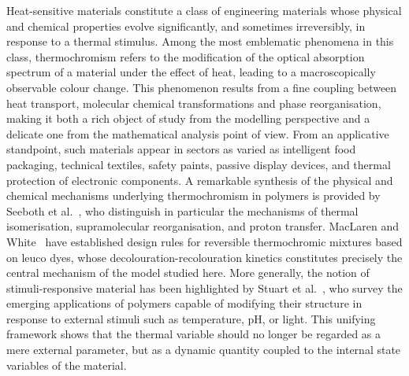 \documentclass[final,1p,times]{elsarticle}
\numberwithin{equation}{section}
\begin{document}
	Heat-sensitive materials constitute a class of engineering materials whose physical and chemical properties evolve significantly, and sometimes irreversibly, in response to a thermal stimulus. Among the most emblematic phenomena in this class, thermochromism refers to the modification of the optical absorption spectrum of a material under the effect of heat, leading to a macroscopically observable colour change. This phenomenon results from a fine coupling between heat transport, molecular chemical transformations and phase reorganisation, making it both a rich object of study from the modelling perspective and a delicate one from the mathematical analysis point of view. From an applicative standpoint, such materials appear in sectors as varied as intelligent food packaging, technical textiles, safety paints, passive display devices, and thermal protection of electronic components. A remarkable synthesis of the physical and chemical mechanisms underlying thermochromism in polymers is provided by Seeboth et al.~\cite{SeebothEtal2014}, who distinguish in particular the mechanisms of thermal isomerisation, supramolecular reorganisation, and proton transfer. MacLaren and White~\cite{MacLarenWhite2005} have established design rules for reversible thermochromic mixtures based on leuco dyes, whose decolouration-recolouration kinetics constitutes precisely the central mechanism of the model studied here. More generally, the notion of stimuli-responsive material has been highlighted by Stuart et al.~\cite{StuartEtal2010}, who survey the emerging applications of polymers capable of modifying their structure in response to external stimuli such as temperature, pH, or light. This unifying framework shows that the thermal variable should no longer be regarded as a mere external parameter, but as a dynamic quantity coupled to the internal state variables of the material.
	
\end{document}
